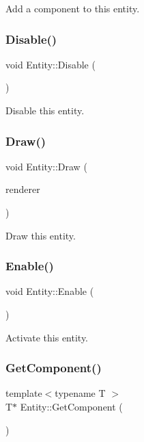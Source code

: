 Add a component to this entity. \mbox{\label{class_entity_a60976526014b5f8d65666cd51740d421}} 
\subsubsection{\texorpdfstring{Disable()}{Disable()}}
{\footnotesize\ttfamily void Entity\+::\+Disable (\begin{DoxyParamCaption}{ }\end{DoxyParamCaption})}

Disable this entity. \mbox{\label{class_entity_aae4367e01c9e539bc016b6ffa8dcf3d5}} 
\subsubsection{\texorpdfstring{Draw()}{Draw()}}
{\footnotesize\ttfamily void Entity\+::\+Draw (\begin{DoxyParamCaption}\item[{S\+D\+L\+\_\+\+Renderer $\ast$}]{renderer }\end{DoxyParamCaption})\hspace{0.3cm}{\ttfamily [virtual]}}

Draw this entity. \mbox{\label{class_entity_ad940b54ddb93e1b2cc72012589576478}} 
\subsubsection{\texorpdfstring{Enable()}{Enable()}}
{\footnotesize\ttfamily void Entity\+::\+Enable (\begin{DoxyParamCaption}{ }\end{DoxyParamCaption})}

Activate this entity. \mbox{\label{class_entity_a0084a74b2e2a363e4d3224d1877b9cf3}} 
\subsubsection{\texorpdfstring{Get\+Component()}{GetComponent()}}
{\footnotesize\ttfamily template$<$typename T $>$ \\
T$\ast$ Entity\+::\+Get\+Component (\begin{DoxyParamCaption}{ }\end{DoxyParamCaption})\hspace{0.3cm}{\ttfamily [inline]}}


